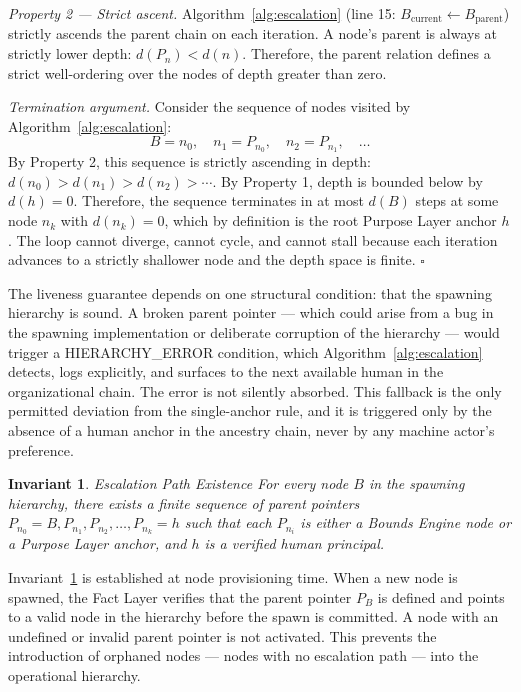\documentclass[12pt]{article}
\newtheorem{invariant}{Invariant}
\begin{document}
\noindent\textit{Property 2 — Strict ascent.} Algorithm~\ref{alg:escalation} (line 15: $B_{\text{current}} \leftarrow B_{\text{parent}}$) strictly ascends the parent chain on each iteration. A node's parent is always at strictly lower depth: $d(P_n) < d(n)$. Therefore, the parent relation defines a strict well-ordering over the nodes of depth greater than zero.

\medskip

\noindent\textit{Termination argument.} Consider the sequence of nodes visited by Algorithm~\ref{alg:escalation}:
\[ B = n_0,\quad n_1 = P_{n_0},\quad n_2 = P_{n_1},\quad \ldots \]
By Property 2, this sequence is strictly ascending in depth: $d(n_0) > d(n_1) > d(n_2) > \cdots$. By Property 1, depth is bounded below by $d(h) = 0$. Therefore, the sequence terminates in at most $d(B)$ steps at some node $n_k$ with $d(n_k) = 0$, which by definition is the root Purpose Layer anchor $h$. The loop cannot diverge, cannot cycle, and cannot stall because each iteration advances to a strictly shallower node and the depth space is finite. $\square$

\medskip

The liveness guarantee depends on one structural condition: that the spawning hierarchy is sound. A broken parent pointer — which could arise from a bug in the spawning implementation or deliberate corruption of the hierarchy — would trigger a HIERARCHY\_ERROR condition, which Algorithm~\ref{alg:escalation} detects, logs explicitly, and surfaces to the next available human in the organizational chain. The error is not silently absorbed. This fallback is the only permitted deviation from the single-anchor rule, and it is triggered only by the absence of a human anchor in the ancestry chain, never by any machine actor's preference.

\begin{invariant}{Escalation Path Existence}
\label{inv:escalation-path}
For every node $B$ in the spawning hierarchy, there exists a finite sequence of parent pointers $P_{n_0} = B, P_{n_1}, P_{n_2}, \ldots, P_{n_k} = h$ such that each $P_{n_i}$ is either a Bounds Engine node or a Purpose Layer anchor, and $h$ is a verified human principal.
\end{invariant}

Invariant~\ref{inv:escalation-path} is established at node provisioning time. When a new node is spawned, the Fact Layer verifies that the parent pointer $P_B$ is defined and points to a valid node in the hierarchy before the spawn is committed. A node with an undefined or invalid parent pointer is not activated. This prevents the introduction of orphaned nodes — nodes with no escalation path — into the operational hierarchy.
\end{document}
